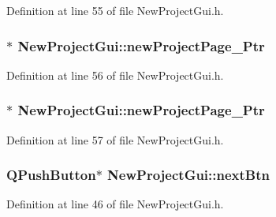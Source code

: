 Definition at line 55 of file New\-Project\-Gui.\-h.

\hypertarget{class_new_project_gui_a16ff0aedd402588686ae3f02b4226fc0}{
\subsubsection[{new\-Project\-Page\-\_\-3\-Ptr}]{$\ast$ New\-Project\-Gui\-::new\-Project\-Page\-\_\-Ptr\hspace{0.3cm}{\ttfamily [private]}}}\label{class_new_project_gui_a16ff0aedd402588686ae3f02b4226fc0}


Definition at line 56 of file New\-Project\-Gui.\-h.

\hypertarget{class_new_project_gui_a4c4e20d7598c3c61a45eb51a0332a326}{
\subsubsection[{new\-Project\-Page\-\_\-4\-Ptr}]{$\ast$ New\-Project\-Gui\-::new\-Project\-Page\-\_\-Ptr\hspace{0.3cm}{\ttfamily [private]}}}\label{class_new_project_gui_a4c4e20d7598c3c61a45eb51a0332a326}


Definition at line 57 of file New\-Project\-Gui.\-h.

\hypertarget{class_new_project_gui_af79d8f88c0d0aa8e783240c2e6ba6e8b}{
\subsubsection[{next\-Btn}]{\setlength{\rightskip}{0pt plus 5cm}Q\-Push\-Button$\ast$ New\-Project\-Gui\-::next\-Btn\hspace{0.3cm}{\ttfamily [private]}}}\label{class_new_project_gui_af79d8f88c0d0aa8e783240c2e6ba6e8b}


Definition at line 46 of file New\-Project\-Gui.\-h.

